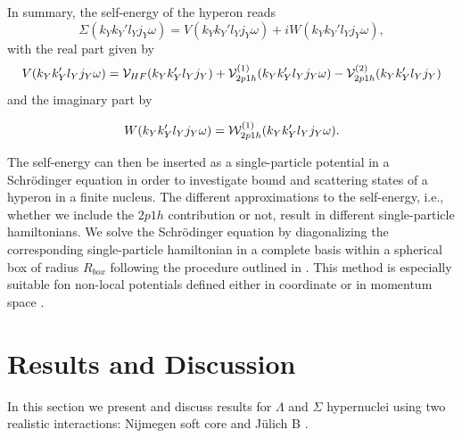 In summary, the self-energy of the hyperon reads
\begin{equation}
    \Sigma(k_{Y}k_{Y}'l_{Y}j_{Y}\omega)=
    V(k_{Y}k_{Y}'l_{Y}j_{Y}\omega)+
    iW(k_{Y}k_{Y}'l_{Y}j_{Y}\omega),
    \label{eq:self_ener}
\end{equation}
with the real part given by
\begin{equation}
    V(k_{Y}k_{Y}'l_{Y}j_{Y}\omega)=
       {\cal V}_{HF}(k_{Y}k_{Y}'l_{Y}j_{Y})+
       {\cal V}^{(1)}_{2p1h}(k_{Y}k_{Y}'l_{Y}j_{Y}
        \omega)-
       {\cal V}^{(2)}_{2p1h}(k_{Y}k_{Y}'l_{Y}j_{Y}
       )
       \label{eq:realV}
\end{equation}
and the imaginary part by

\begin{equation}
    W(k_{Y}k_{Y}'l_{Y}j_{Y}\omega)=
       {\cal W}^{(1)}_{2p1h}(k_{Y}k_{Y}'l_{Y}j_{Y}\omega).
       \label{eq:imV}
\end{equation}




The self-energy can then be inserted as a single-particle
potential in a Schr\"o\-din\-ger equation in order to investigate
bound and scattering states of a  hyperon
in a finite nucleus. The different approximations to the
self-energy, i.e., whether we include the $2p1h$
contribution
or not, result in different single-particle hamiltonians. We solve
the Schr\"o\-din\-ger equation by diagonalizing the corresponding
single-particle hamiltonian in a complete basis within a spherical box
of radius $R_{box}$ following the procedure outlined in \cite{hjort96}. 
This method  is especially suitable fon non-local potentials defined either in coordinate or 
in momentum space \cite{bbmp92,hmp94}.  



\section{Results and Discussion}
\label{results}
In this section we present and discuss results for $\Lambda$
and $\Sigma$ hypernuclei
using two realistic interactions: 
Nijmegen soft core \cite{nijmegen} and J\"ulich B \cite{juelich}.

